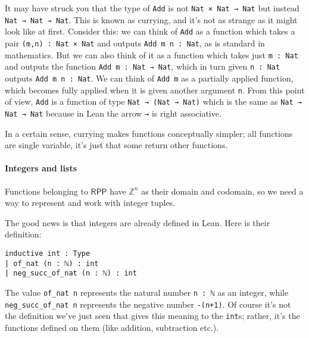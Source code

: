 \documentclass{book}
\theoremstyle{definition}
\theoremstyle{remark}
\theoremstyle{plain}
\newcommand{\Z}{\mathbb{Z}}
\newcommand{\RPP}{\mathsf{RPP}}
\begin{document}
It may have struck you that the type of \lstinline{Add} is not \lstinline{Nat × Nat → Nat}
but instead \lstinline{Nat → Nat → Nat}.
This is known as currying, and it's not as strange as it might look like at first.
Consider this: we can think of \lstinline{Add} as a function which takes a pair \lstinline{(m,n) : Nat × Nat} and outputs \lstinline{Add m n : Nat},
as is standard in mathematics.
But we can also think of it as a function which takes just \lstinline{m : Nat} and outputs the function \lstinline{Add m : Nat → Nat},
which in turn given \lstinline{n : Nat} outputs \lstinline{Add m n : Nat}.
We can think of \lstinline{Add m} as a partially applied function, which becomes fully applied when it is given another argument \lstinline{n}.
From this point of view, \lstinline{Add} is a function of type \lstinline{Nat → (Nat → Nat)} which is the same as
\lstinline{Nat → Nat → Nat} because in Lean the arrow \lstinline{→} is right associative.

In a certain sense, currying makes functions conceptually simpler;
all functions are single variable, it's just that some return other functions.

\paragraph{Integers and lists}
Functions belonging to $\RPP$ have $\Z^n$ as their domain and codomain,
so we need a way to represent and work with integer tuples.

The good news is that integers are already defined in Lean.
Here is their definition:
\begin{lstlisting}
inductive int : Type
| of_nat (n : ℕ) : int
| neg_succ_of_nat (n : ℕ) : int  
\end{lstlisting}
The value \lstinline{of_nat n} represents the natural number \lstinline{n : ℕ} as an integer,
while \lstinline{neg_succ_of_nat n} represents the negative number \lstinline{-(n+1)}.
Of course it's not the definition we've just seen that gives this meaning to the \lstinline{int}s;
rather, it's the functions defined on them (like addition, subtraction etc.).
\end{document}
